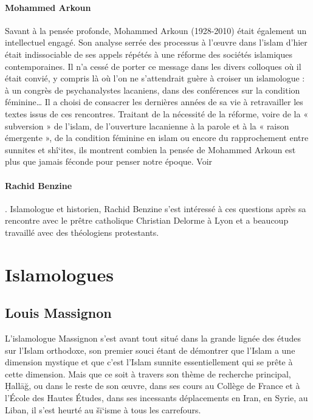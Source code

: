 \paragraph{Mohammed Arkoun}
Savant à la pensée profonde, Mohammed Arkoun (1928-2010) était également un intellectuel engagé. Son analyse serrée des processus à l’œuvre dans l’islam d’hier était indissociable de ses appels répétés à une réforme des sociétés islamiques contemporaines. Il n’a cessé de porter ce message dans les divers colloques où il était convié, y compris là où l’on ne s’attendrait guère à croiser un islamologue : à un congrès de psychanalystes lacaniens, dans des conférences sur la condition féminine…
Il a choisi de consacrer les dernières années de sa vie à retravailler les textes issus de ces rencontres. Traitant de la nécessité de la réforme, voire de la « subversion » de l’islam, de l’ouverture lacanienne à la parole et à la « raison émergente », de la condition féminine en islam ou encore du rapprochement entre sunnites et shî‘ites, ils montrent combien la pensée de Mohammed Arkoun est plus que jamais féconde pour penser notre époque.
Voir   
\label{theol:Arkoun3}

\paragraph{Rachid Benzine}.
Islamologue et historien, Rachid Benzine s’est intéressé à ces questions après sa rencontre avec le prêtre catholique Christian Delorme à Lyon et a beaucoup travaillé avec des théologiens protestants.



\section{Islamologues}

\subsection{Louis Massignon}


L’islamologue Massignon s’est avant tout situé dans la grande lignée des études sur l’Islam orthodoxe, son premier souci étant de démontrer que l’Islam a une dimension mystique et que c’est l’Islam sunnite essentiellement qui se prête à cette dimension. Mais que ce soit à travers son thème de recherche principal, Ḥallāğ, ou dans le reste de son œuvre, dans ses cours au Collège de France et à l’École des Hautes Études, dans ses incessants déplacements en Iran, en Syrie, au Liban, il s’est heurté au šī‘isme à tous les carrefours.

